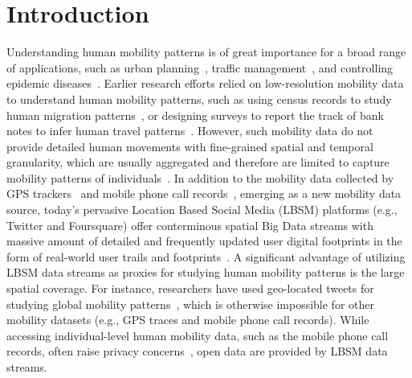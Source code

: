 \documentclass[ijgi,article,accept,moreauthors,pdftex,10pt,a4paper]{mdpi}
\theoremstyle{mdpi}
\newcounter{ex}
\newcounter{re}
\theoremstyle{mdpidefinition}
\begin{document}


\section{Introduction}
Understanding human mobility patterns is of great importance for a broad range of applications, such as urban planning~\cite{zheng2008understanding}, traffic management~\cite{jiang2009characterizing}, and controlling epidemic diseases~\cite{belik2011natural}.
Earlier research efforts relied on low-resolution mobility data to understand human mobility patterns, such as using census records to study human migration patterns~\cite{greenwood1985human}, or designing surveys to report the track of bank notes to infer human travel patterns~\cite{brockmann2006scaling}.
However, such mobility data do not provide detailed human movements with fine-grained spatial and temporal granularity, which are usually aggregated and therefore are limited to capture mobility patterns of individuals~\cite{gonzalez2008understanding,Jurdak2015}.
In addition to the mobility data collected by GPS trackers~\cite{zheng2008understanding, rhee2011levy} and mobile phone call records~\cite{gonzalez2008understanding,sevtsuk2010does,kung2014exploring}, emerging as a new mobility data source, today's pervasive Location Based Social Media (LBSM) platforms (e.g., Twitter and Foursquare) offer conterminous spatial Big Data streams with massive amount of detailed and frequently updated user digital footprints in the form of real-world user trails and footprints~\cite{thatcher2014living}.
A significant advantage of utilizing LBSM data streams as proxies for studying human mobility patterns is the large spatial coverage.
For instance, researchers have used geo-located tweets for studying global mobility patterns~\cite{hawelka2014geo}, which is otherwise impossible for other mobility datasets (e.g., GPS traces and mobile phone call records).
While accessing individual-level human mobility data, such as the mobile phone call records, often raise privacy concerns~\cite{giannotti2008mobility,crampton2014collect,Jurdak2015}, open data are provided by LBSM data streams.
\end{document}
